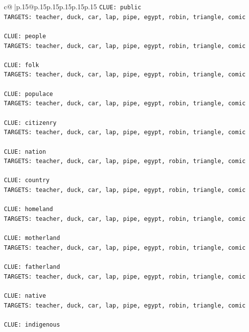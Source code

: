 \documentclass{article}
\begin{document}
{\begin{supertabular}{c@{$\;$}|p{.15\linewidth}@{}p{.15\linewidth}p{.15\linewidth}p{.15\linewidth}p{.15\linewidth}p{.15\linewidth}}
{{{\texttt{CLUE: public} \\
\texttt{TARGETS: teacher, duck, car, lap, pipe, egypt, robin, triangle, comic} \\
\\ 
\texttt{CLUE: people} \\
\texttt{TARGETS: teacher, duck, car, lap, pipe, egypt, robin, triangle, comic} \\
\\ 
\texttt{CLUE: folk} \\
\texttt{TARGETS: teacher, duck, car, lap, pipe, egypt, robin, triangle, comic} \\
\\ 
\texttt{CLUE: populace} \\
\texttt{TARGETS: teacher, duck, car, lap, pipe, egypt, robin, triangle, comic} \\
\\ 
\texttt{CLUE: citizenry} \\
\texttt{TARGETS: teacher, duck, car, lap, pipe, egypt, robin, triangle, comic} \\
\\ 
\texttt{CLUE: nation} \\
\texttt{TARGETS: teacher, duck, car, lap, pipe, egypt, robin, triangle, comic} \\
\\ 
\texttt{CLUE: country} \\
\texttt{TARGETS: teacher, duck, car, lap, pipe, egypt, robin, triangle, comic} \\
\\ 
\texttt{CLUE: homeland} \\
\texttt{TARGETS: teacher, duck, car, lap, pipe, egypt, robin, triangle, comic} \\
\\ 
\texttt{CLUE: motherland} \\
\texttt{TARGETS: teacher, duck, car, lap, pipe, egypt, robin, triangle, comic} \\
\\ 
\texttt{CLUE: fatherland} \\
\texttt{TARGETS: teacher, duck, car, lap, pipe, egypt, robin, triangle, comic} \\
\\ 
\texttt{CLUE: native} \\
\texttt{TARGETS: teacher, duck, car, lap, pipe, egypt, robin, triangle, comic} \\
\\ 
\texttt{CLUE: indigenous} \\
}}}
\end{supertabular}}
\end{document}
